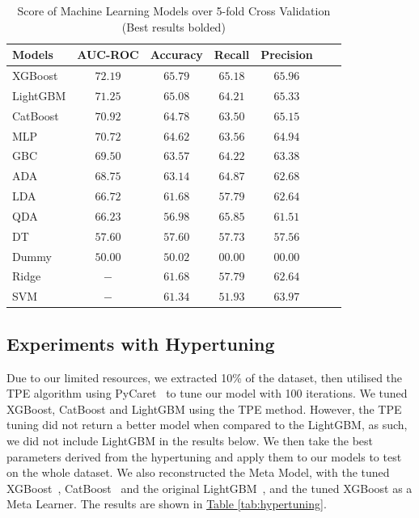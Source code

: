 \documentclass[pdflatex,sn-basic,Numbered]{sn-jnl}%
\theoremstyle{thmstyleone}%
\theoremstyle{thmstyletwo}%
\theoremstyle{thmstylethree}%
\newcommand{\reftable}[1]{\hyperref[#1]{Table \ref*{#1}}}
\begin{document}
\begin{table}[ht]
\centering
\caption{Score of Machine Learning Models over 5-fold Cross Validation (Best results bolded)}
\label{tab:allaimodels}
\begin{tabular}{@{}lcccccc@{}}
\toprule
 \textbf{Models} & \textbf{AUC-ROC} & \textbf{Accuracy} & \textbf{Recall}  & \textbf{Precision} \\ \midrule
XGBoost & $72.19$ & $65.79$ & $65.18$ & $65.96$ \\
LightGBM & $71.25$ & $65.08$ & $64.21$ & $65.33$ \\ 
CatBoost & $70.92$ & $64.78$ & $63.50$ & $65.15$ \\ 
MLP & $70.72$ & $64.62 $ & $63.56$ & $64.94$ \\ 
GBC & $69.50$ & $63.57 $ & $64.22$ & $63.38$ \\ 
ADA & $68.75$ & $63.14$ & $64.87$ & $62.68$ \\ 
LDA & $66.72$ & $61.68$ & $57.79$ & $62.64$ \\ 
QDA & $66.23$ & $56.98$ & $65.85$ & $61.51$ \\ 
DT & $57.60$ & $57.60$ & $57.73$ & $57.56$ \\ 
Dummy & $50.00$ & $50.02$ & $00.00$ & $00.00$ \\ 
Ridge & $-$ & $61.68$ & $57.79$ & $62.64$ \\
SVM & $-$ & $61.34$ & $51.93$ & $63.97$ \\ \bottomrule
\end{tabular}%
\vspace{-1ex}
\end{table}

\subsection{Experiments with Hypertuning}\label{subsec:experiments-with-hypertuning}
Due to our limited resources, we extracted 10\% of the dataset, then utilised the TPE algorithm using PyCaret~\cite{pycaret} to tune our model with 100 iterations.
We tuned XGBoost, CatBoost and LightGBM using the TPE method.
However, the TPE tuning did not return a better model when compared to the LightGBM, as such, we did not include LightGBM in the results below.
We then take the best parameters derived from the hypertuning and apply them to our models to test on the whole dataset.
We also reconstructed the Meta Model, with the tuned XGBoost~\cite{Chen:2016:XST:2939672.2939785}, CatBoost~\cite{cat} and the original LightGBM~\cite{ke2017lightgbm}, and the tuned XGBoost as a Meta Learner. The results are shown in \reftable{tab:hypertuning}.
\end{document}
